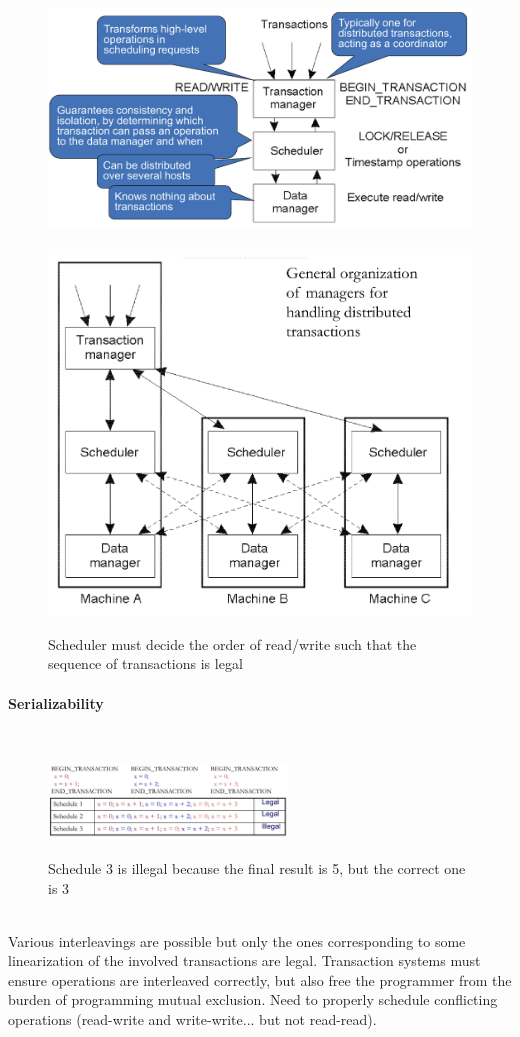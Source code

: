 \documentclass[10pt,a4paper]{article}
\newcommand{\myparagraph}[1]{\paragraph{#1}\mbox{}\\[0.05in]}
\begin{document}
\begin{figure}[h!]
\centering
\begin{minipage}{.5\textwidth}
  \includegraphics[width=.7\linewidth]{images/ctrl-concurrency.png}
  \label{fig:ctrl-concurrency}
\end{minipage}%
\begin{minipage}{.5\textwidth}
  \includegraphics[width=.7\linewidth]{images/dist-scheduler.png}
  \label{fig:dist-scheduler}
  \caption{Scheduler must decide the order of read/write such that the sequence of transactions is legal}
\end{minipage}
\end{figure} 
\myparagraph{Serializability}
\begin{figure}[h!]
 \hfill \includegraphics[width=180pt]{images/serializability.png}\hspace*{\fill}
  \label{fig:serializability}
  \caption{Schedule 3 is illegal because the final result is 5, but the correct one is 3}
\end{figure} \\
Various interleavings are possible but only the ones corresponding to some linearization of the involved transactions are legal. Transaction systems must ensure operations are interleaved correctly, but also free the programmer from the burden of programming mutual exclusion. Need to properly schedule conflicting operations (read-write and write-write... but not read-read).
\end{document}
